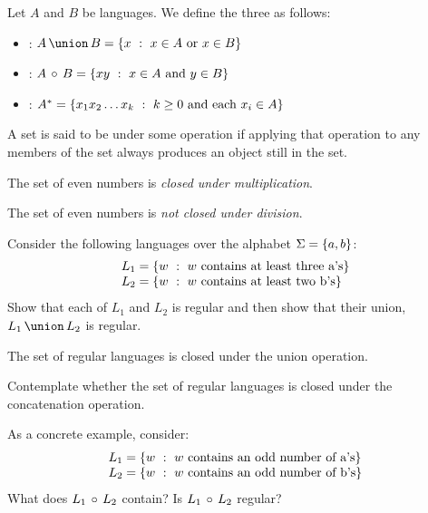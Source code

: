 \documentclass[twoside,letterpaper,openany]{book}
\begin{document}
\begin{defn}\label{def:regops}
Let $A$ and $B$ be languages. We define the three  as follows:
\begin{itemize}
\item {}: $\setunion A B = \setbuild{x}{x \in A~\textrm{or}~x \in B}$
\item {}: $A\,\circ\,B = \left\lbrace xy\ :\ x \in A~\textrm{and}~y \in B \right\rbrace$
\item {}: $A^{*} = \left\lbrace x_1 x_2 \ldots x_k\ :\ k \geq 0 ~\textrm{and each}~x_i \in A \right\rbrace$
\end{itemize}
\end{defn}

\begin{defn}[Closure]
A set is said to be  under some operation if applying that operation to any members of the set always produces an object still in the set.
\end{defn}

\begin{thm}
The set of even numbers is \emph{closed under multiplication}.
\end{thm}

\begin{thm}
The set of even numbers is \emph{not closed under division}.
\end{thm}

\begin{exer}
Consider the following languages over the alphabet $\Sigma = \left\lbrace a, b \right\rbrace$:
\[\begin{array}{l}
L_1 = \left\lbrace w\ :\ w~\textrm{contains at least three a's} \right\rbrace \\
L_2 = \left\lbrace w\ :\ w~\textrm{contains at least two b's} \right\rbrace
\end{array}\]
Show that each of $L_1$ and $L_2$ is regular and then show that their union, $\setunion{L_1}{L_2}$ is regular.
\end{exer}

\begin{thm}
The set of regular languages is closed under the union operation.
\end{thm}

\begin{exer}
Contemplate whether the set of regular languages is closed under the concatenation operation. 

As a concrete example, consider:
\[\begin{array}{l}
L_1 = \left\lbrace w\ :\ w~\textrm{contains an odd number of a's} \right\rbrace \\
L_2 = \left\lbrace w\ :\ w~\textrm{contains an odd number of b's} \right\rbrace
\end{array}\]
What does $L_1\,\circ\,L_2$ contain? Is $L_1\,\circ\,L_2$ regular?
\end{exer}
\end{document}
